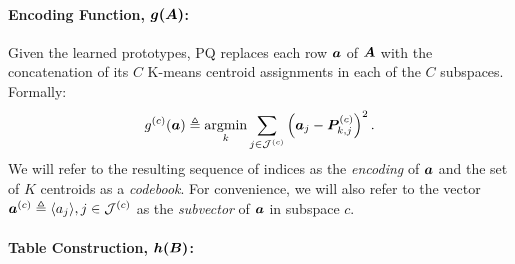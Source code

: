 
\paragraph{Encoding Function, $\bm{g(\bm{A})}$:}

Given the learned prototypes, PQ replaces each row $\bm{a}$ of $\bm{A}$ with the concatenation of its $C$ K-means centroid assignments in each of the $C$ subspaces. Formally:
\vspace{-.5mm}
\begin{align} \label{eq:pqLoss}
    g^{(c)}(\a) \triangleq \argmin_k \sum_{j\in \mathcal{J}^{(c)}} \left( \a_j - \mat{P}^{(c)}_{k,j} \right)^2.
\vspace*{-.5mm}
\end{align}
We will refer to the resulting sequence of indices as the \textit{encoding} of $\bm{a}$ and the set of $K$ centroids as a \textit{codebook}. For convenience, we will also refer to the vector $\bm{a}^{(c)} \triangleq \langle a_j \rangle, j \in \mathcal{J}^{(c)}$ as the \textit{subvector} of $\bm{a}$ in subspace $c$. %

\paragraph{Table Construction, $\bm{h(\bm{B})}$:}

